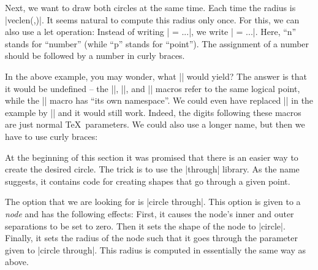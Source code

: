 Next, we want to draw both circles at the same time. Each time the radius is
|veclen(,)|. It seems natural to compute this radius only once. For this,
we can also use a let operation: Instead of writing | = ...|, we write
| = ...|. Here, ``n'' stands for ``number'' (while ``p'' stands for
``point''). The assignment of a number should be followed by a number in curly
braces.
%
\begin{codeexample}[preamble={\usetikzlibrary{calc}}]
\end{codeexample}
%
In the above example, you may wonder, what || would yield? The answer is
that it would be undefined -- the |\p|, |\x|, and |\y| macros refer to the same
logical point, while the |\n| macro has ``its own namespace''. We could even
have replaced || in the example by || and it would still work. Indeed,
the digits following these macros are just normal \TeX\ parameters. We could
also use a longer name, but then we have to use curly braces:
%
\begin{codeexample}[preamble={\usetikzlibrary{calc}}]
\end{codeexample}

At the beginning of this section it was promised that there is an easier way to
create the desired circle. The trick is to use the |through| library. As the
name suggests, it contains code for creating shapes that go through a given
point.

The option that we are looking for is |circle through|. This option is given to
a \emph{node} and has the following effects: First, it causes the node's inner
and outer separations to be set to zero. Then it sets the shape of the node to
|circle|. Finally, it sets the radius of the node such that it goes through the
parameter given to |circle through|. This radius is computed in essentially the
same way as above.
%
\begin{codeexample}[preamble={\usetikzlibrary{through}}]
\end{codeexample}


